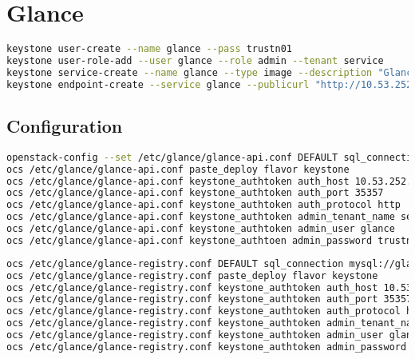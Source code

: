 \documentclass[11pt,letterpaper,oneside]{book}
\begin{document}

\chapter{Glance}

\begin{lstlisting}[caption={Glance Keystone create},language=bash]
keystone user-create --name glance --pass trustn01
keystone user-role-add --user glance --role admin --tenant service
keystone service-create --name glance --type image --description "Glance Image Service"
keystone endpoint-create --service glance --publicurl "http://10.53.252.61:9292" --adminurl "http://10.53.252.61:9292" --internalurl "http://10.53.252.61:9292"
\end{lstlisting}

\section{Configuration}
\begin{lstlisting}[caption={Glance API},language=bash]
openstack-config --set /etc/glance/glance-api.conf DEFAULT sql_connection mysql://glance:trustn01@10.53.252.61/glance
ocs /etc/glance/glance-api.conf paste_deploy flavor keystone
ocs /etc/glance/glance-api.conf keystone_authtoken auth_host 10.53.252.61
ocs /etc/glance/glance-api.conf keystone_authtoken auth_port 35357
ocs /etc/glance/glance-api.conf keystone_authtoken auth_protocol http
ocs /etc/glance/glance-api.conf keystone_authtoken admin_tenant_name service
ocs /etc/glance/glance-api.conf keystone_authtoken admin_user glance
ocs /etc/glance/glance-api.conf keystone_authtoen admin_password trustn01
\end{lstlisting}

\begin{lstlisting}[caption={Glance Registry},language=bash]
ocs /etc/glance/glance-registry.conf DEFAULT sql_connection mysql://glance:trustn01@10.53.252.61/glance
ocs /etc/glance/glance-registry.conf paste_deploy flavor keystone
ocs /etc/glance/glance-registry.conf keystone_authtoken auth_host 10.53.252.61
ocs /etc/glance/glance-registry.conf keystone_authtoken auth_port 35357
ocs /etc/glance/glance-registry.conf keystone_authtoken auth_protocol http
ocs /etc/glance/glance-registry.conf keystone_authtoken admin_tenant_name service
ocs /etc/glance/glance-registry.conf keystone_authtoken admin_user glance
ocs /etc/glance/glance-registry.conf keystone_authtoken admin_password trustn01
\end{lstlisting}
\end{document}

